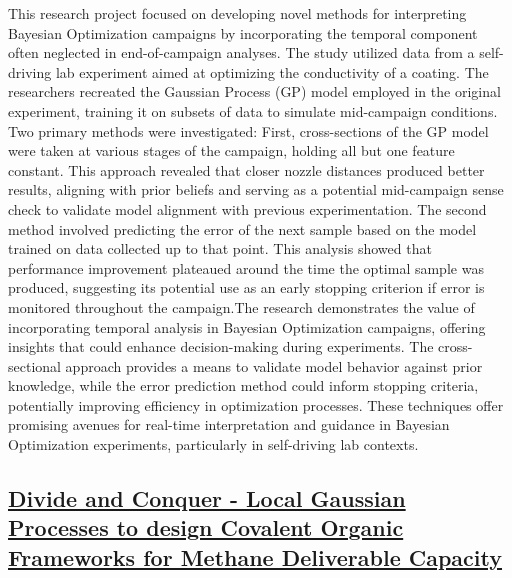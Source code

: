 This research project focused on developing novel methods for interpreting Bayesian Optimization campaigns by incorporating the temporal component often neglected in end-of-campaign analyses. The study utilized data from a self-driving lab experiment aimed at optimizing the conductivity of a coating. The researchers recreated the Gaussian Process (GP) model employed in the original experiment, training it on subsets of data to simulate mid-campaign conditions. Two primary methods were investigated: First, cross-sections of the GP model were taken at various stages of the campaign, holding all but one feature constant. This approach revealed that closer nozzle distances produced better results, aligning with prior beliefs and serving as a potential mid-campaign sense check to validate model alignment with previous experimentation. The second method involved predicting the error of the next sample based on the model trained on data collected up to that point. This analysis showed that performance improvement plateaued around the time the optimal sample was produced, suggesting its potential use as an early stopping criterion if error is monitored throughout the campaign.The research demonstrates the value of incorporating temporal analysis in Bayesian Optimization campaigns, offering insights that could enhance decision-making during experiments. The cross-sectional approach provides a means to validate model behavior against prior knowledge, while the error prediction method could inform stopping criteria, potentially improving efficiency in optimization processes. These techniques offer promising avenues for real-time interpretation and guidance in Bayesian Optimization experiments, particularly in self-driving lab contexts.
 \subsection*{\href{https://www.youtube.com/watch?v=iog-07Ekp9g}{Divide and Conquer - Local Gaussian Processes to design Covalent Organic Frameworks for Methane Deliverable Capacity}}

